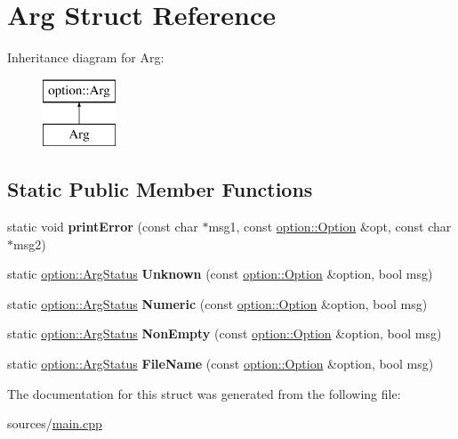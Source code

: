 \hypertarget{structArg}{}\section{Arg Struct Reference}
\label{structArg}
Inheritance diagram for Arg\+:\begin{figure}[H]
\begin{center}
\leavevmode
\includegraphics[height=2.000000cm]{structArg}
\end{center}
\end{figure}
\subsection*{Static Public Member Functions}
\begin{DoxyCompactItemize}
\item 
\mbox{\label{structArg_ac02bc8cf3aec0a37643d1c4e72e53247}} 
static void {\bfseries print\+Error} (const char $\ast$msg1, const \hyperlink{classoption_1_1Option}{option\+::\+Option} \&opt, const char $\ast$msg2)
\item 
\mbox{\label{structArg_a27e735e03504971f760309d1045b2602}} 
static \hyperlink{namespaceoption_aee8c76a07877335762631491e7a5a1a9}{option\+::\+Arg\+Status} {\bfseries Unknown} (const \hyperlink{classoption_1_1Option}{option\+::\+Option} \&option, bool msg)
\item 
\mbox{\label{structArg_a38aa6a5804c73eaacf5aa1feed10d495}} 
static \hyperlink{namespaceoption_aee8c76a07877335762631491e7a5a1a9}{option\+::\+Arg\+Status} {\bfseries Numeric} (const \hyperlink{classoption_1_1Option}{option\+::\+Option} \&option, bool msg)
\item 
\mbox{\label{structArg_a44445181427d8c2b953ed1ac8cf653f0}} 
static \hyperlink{namespaceoption_aee8c76a07877335762631491e7a5a1a9}{option\+::\+Arg\+Status} {\bfseries Non\+Empty} (const \hyperlink{classoption_1_1Option}{option\+::\+Option} \&option, bool msg)
\item 
\mbox{\label{structArg_a7236f63281660f890f7ea961536f0b5e}} 
static \hyperlink{namespaceoption_aee8c76a07877335762631491e7a5a1a9}{option\+::\+Arg\+Status} {\bfseries File\+Name} (const \hyperlink{classoption_1_1Option}{option\+::\+Option} \&option, bool msg)
\end{DoxyCompactItemize}


The documentation for this struct was generated from the following file\+:\begin{DoxyCompactItemize}
\item 
sources/\hyperlink{main_8cpp}{main.\+cpp}\end{DoxyCompactItemize}
